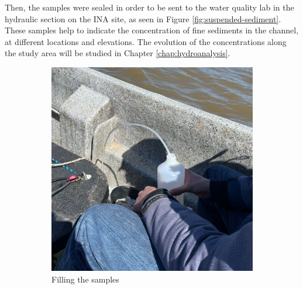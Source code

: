 Then, the samples were sealed in order to be sent to the water quality lab in the hydraulic section on the INA site, as seen in Figure \ref{fig:suspended-sediment}. These samples help to indicate the concentration of fine sediments in the channel, at different locations and elevations. The evolution of the concentrations along the study area will be studied in Chapter \ref{chap:hydroanalysis}.

\begin{figure}[H]
    \centering
    \begin{subfigure}[t]{0.48\textwidth}
        \centering
        \includegraphics[width=\linewidth]{figures/ch4/fles.jpg}
        \caption{Filling the samples}
    \end{subfigure}
    \hfill
    \begin{subfigure}[t]{0.48\textwidth}
        \centering

\end{subfigure}
\end{figure}

